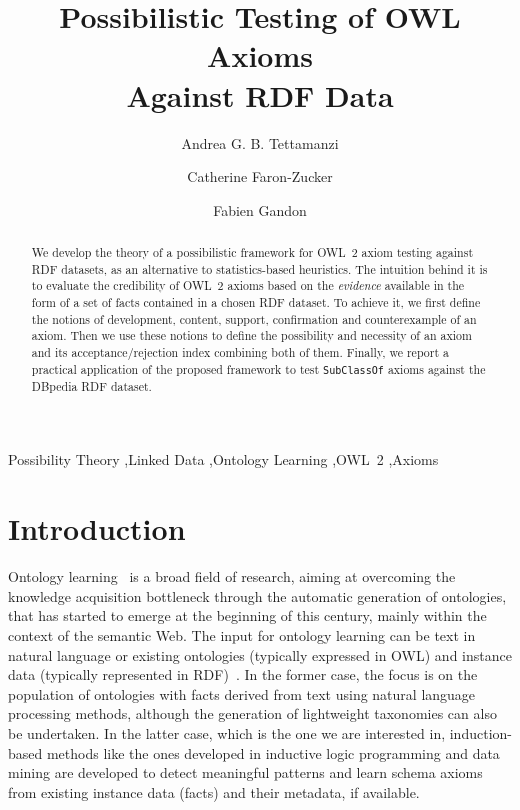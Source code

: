 \documentclass[review]{elsarticle}
\theoremstyle{definition}
\begin{document}
\begin{frontmatter}

\title{Possibilistic Testing of OWL Axioms\\ Against RDF Data%
}

\author[I3S]{Andrea G. B. Tettamanzi}

\author[I3S]{Catherine Faron-Zucker}

\author[I3S]{Fabien Gandon}

\address[I3S]{Universit\'e C\^ote d'Azur, Inria, CNRS, I3S, 2000, route des Lucioles, Sophia Antipolis, France}

\begin{abstract}
We develop the theory of a possibilistic framework for OWL~2 axiom testing against RDF datasets,
as an alternative to statistics-based heuristics. The intuition behind it is to evaluate the credibility of OWL~2 axioms based on the \emph{evidence} available
in the form of a set of facts contained in a chosen RDF dataset. To achieve it, we first define the notions of development, content, support, confirmation and counterexample of an axiom. Then we use these notions to define the possibility and necessity of an axiom and its acceptance/rejection index combining both of them. 
Finally, we report a practical application of the proposed framework to test \texttt{SubClassOf} axioms against the DBpedia RDF dataset.
\end{abstract}

\begin{keyword}
Possibility Theory \sep Linked Data \sep Ontology Learning \sep OWL~2 \sep Axioms
\end{keyword}

\end{frontmatter}

\linenumbers

\section{Introduction}

Ontology learning~\cite{MaedcheStaab2001} is a broad field of research, aiming at
overcoming the knowledge acquisition bottleneck through
the automatic generation of ontologies, that has started to emerge at the beginning
of this century, mainly within the context of the semantic Web.
The input for ontology learning can be text in natural language or
existing ontologies (typically expressed in OWL) and instance data (typically
represented in RDF)~\cite{LehmannVoelker2014}.
In the former case, the focus is on the population of ontologies with facts
derived from text using natural language processing methods, although
the generation of lightweight taxonomies can also be undertaken.
In the latter case, which is the one we are interested in,
induction-based methods like the ones developed in
inductive logic programming and data mining are developed to detect meaningful
patterns and learn schema axioms from existing instance data (facts) and
their metadata, if available.
\end{document}
